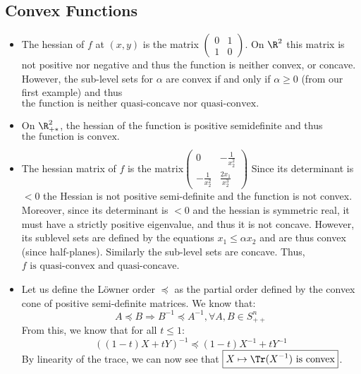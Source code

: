 \documentclass[math, info]{cours}
\begin{document}
\subsection*{Convex Functions}
\begin{itemize}
	\item The hessian of $f$ at $(x,y)$ is the matrix $\begin{pmatrix}
			0 & 1\\
			1 & 0
		\end{pmatrix}$.
		On $\R^{2}$ this matrix is not positive nor negative and thus the function is neither convex, or concave.
However, the sub-level sets for $\alpha$ are convex if and only if $\alpha \geq 0$ (from our first example) and thus $\boxed{\text{the function is neither quasi-concave nor quasi-convex.}}$
	\item On $\R_{+*}^{2}$, the hessian of the function is positive semidefinite and thus $\boxed{\text{the function is convex.}}$
	\item The hessian matrix of $f$ is the matrix$\begin{pmatrix}
			0 & -\frac{1}{x_{2}^{2}}\\
			-\frac{1}{x_{2}^{2}} & \frac{2x_{1}}{x_{2}^{3}}
		\end{pmatrix}$
		Since its determinant is $<0$ the Hessian is not positive semi-definite and the function is not convex.
		Moreover, since its determinant is $<0$ and the hessian is symmetric real, it must have a strictly positive eigenvalue, and thus it is not concave.
		However, its sublevel sets are defined by the equations $x_{1} \leq \alpha x_{2}$ and are thus convex (since half-planes).
		Similarly the sub-level sets are concave.
		Thus, $\boxed{f \text{ is quasi-convex and quasi-concave}}$.
	\item Let us define the Löwner order $\preceq$ as the partial order defined by the convex cone of positive semi-definite matrices.
		We know that:
		\begin{equation*}
			A \preceq B \Rightarrow B^{-1} \preceq A^{-1}, \forall A, B \in S_{++}^{n}
		\end{equation*}
		From this, we know that for all $t \leq 1$:
		\begin{equation*}
			\left( \left( 1 - t \right) X + tY \right)^{-1} \preceq \left( 1 - t \right)X^{-1} + tY^{-1}
		\end{equation*}
		By linearity of the trace, we can now see that $\boxed{X \mapsto \Tr(X^{-1}) \text{ is convex}}$.
\end{itemize}
\end{document}
